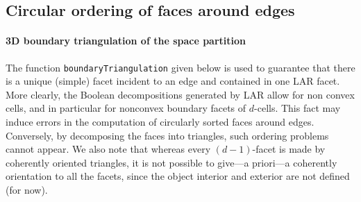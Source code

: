 \documentclass[11pt,oneside]{article}    %
\begin{document}
\subsection{Circular ordering of faces around edges}



\paragraph{3D boundary triangulation of the space partition}
The function \texttt{boundaryTriangu\-la\-tion} given below is used to guarantee that there is a unique (simple) facet incident to an edge and contained in one LAR facet. More clearly, the Boolean decompositions generated by LAR allow for non convex cells, and in particular for nonconvex boundary facets of $d$-cells. This fact may induce errors in the computation of circularly sorted faces around edges. Conversely, by decomposing the faces into triangles, such ordering problems cannot appear.  
We also note that whereas every $(d-1)$-facet is made by coherently oriented triangles, it is not possible to give---a priori---a coherently orientation to all the facets, since the object interior and exterior are not defined (for now).
\end{document}
